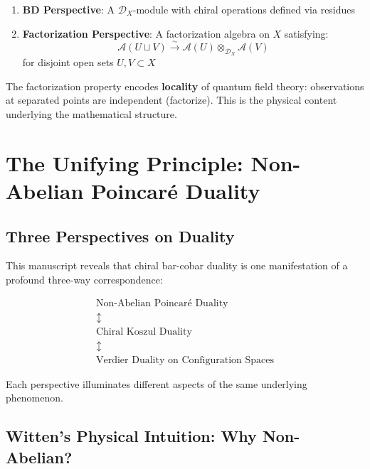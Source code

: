 \begin{enumerate}
\item \textbf{BD Perspective}: A $\mathcal{D}_X$-module with chiral operations defined via residues
\item \textbf{Factorization Perspective}: A factorization algebra on $X$ satisfying:
\begin{equation}
\mathcal{A}(U \sqcup V) \xrightarrow{\sim} \mathcal{A}(U) \otimes_{\mathcal{D}_X} \mathcal{A}(V)
\end{equation}
for disjoint open sets $U, V \subset X$
\end{enumerate}

\begin{remark}
The factorization property encodes \textbf{locality} of quantum field theory: observations at separated points are independent (factorize). This is the physical content underlying the mathematical structure.
\end{remark}

\section{The Unifying Principle: Non-Abelian Poincaré Duality}
\label{sec:NAP-unifying}

\subsection{Three Perspectives on Duality}

\begin{framework}\label{framework:three-way}
This manuscript reveals that chiral bar-cobar duality is one manifestation of a profound three-way correspondence:

$$\boxed{
\begin{array}{c}
\text{Non-Abelian Poincaré Duality} \\
\updownarrow \\
\text{Chiral Koszul Duality} \\
\updownarrow \\
\text{Verdier Duality on Configuration Spaces}
\end{array}
}$$

Each perspective illuminates different aspects of the same underlying phenomenon.
\end{framework}

\subsection{Witten's Physical Intuition: Why Non-Abelian?}

